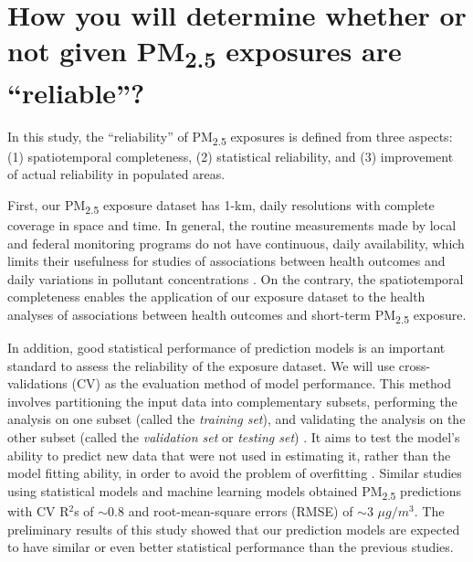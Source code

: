\documentclass[11pt]{article}
\newcommand{\tsub}{\textsubscript}
\begin{document}
\section{How you will determine whether or not given \texorpdfstring{PM\tsub{2.5}}{PM2.5} exposures are ``reliable''?}
In this study, the ``reliability'' of PM\tsub{2.5} exposures is defined from three aspects: (1) spatiotemporal completeness, (2) statistical reliability, and (3) improvement of actual reliability in populated areas.
\begin{enumerate*}[{[1)]}]
    \item First, our PM\tsub{2.5} exposure dataset has 1-km, daily resolutions with complete coverage in space and time. In general, the routine measurements made by local and federal monitoring programs do not have continuous, daily availability, which limits their usefulness for studies of associations between health outcomes and daily variations in pollutant concentrations \citep{sarnat2015fine}. On the contrary, the spatiotemporal completeness enables the application of our exposure dataset to the health analyses of associations between health outcomes and short-term PM\tsub{2.5} exposure. 
    \item In addition, good statistical performance of prediction models is an important standard to assess the reliability of the exposure dataset. We will use cross-validations (CV) as the evaluation method of model performance. This method involves partitioning the input data into complementary subsets, performing the analysis on one subset (called the \textit{training set}), and validating the analysis on the other subset (called the \textit{validation set} or \textit{testing set}) \citep{kohavi1995study}. It aims to test the model's ability to predict new data that were not used in estimating it, rather than the model fitting ability, in order to avoid the problem of overfitting \citep{hawkins2004problem}. Similar studies using statistical models \citep{kloog2011assessing, kloog2014new} and machine learning models \citep{di2016assessing, hu2017estimating} obtained PM\tsub{2.5} predictions with CV R$^2$s of $\sim$0.8 and root-mean-square errors (RMSE) of $\sim$3 $\mu g/m^3$. The preliminary results of this study showed that our prediction models are expected to have similar or even better statistical performance than the previous studies. 

\end{enumerate*}
\end{document}
